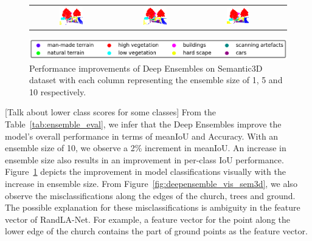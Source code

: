 \begin{figure}[h!]
\begin{tabular}{cccc}
            \includegraphics[width=0.30\textwidth, height=0.15\textheight]{images/seg_output/deep_ensembles/2_1.pdf} &
            \includegraphics[width=0.30\textwidth, height=0.15\textheight]{images/seg_output/deep_ensembles/2_5.pdf}& 
            \includegraphics[width=0.30\textwidth, height=0.15\textheight]{images/seg_output/deep_ensembles/2_10.pdf}\\
        \end{tabular}
        \includegraphics[scale=0.45]{images/legend.png}
        \caption{Performance improvements of Deep Ensembles on Semantic3D dataset with each column representing the ensemble size of 1, 5 and 10 respectively.}
        \label{fig:deepensemble_improv}
    \end{figure}

    [Talk about lower class scores for some classes]
    From the Table~\ref{tab:ensemble_eval}, we infer that the Deep Ensembles improve the model's overall performance in terms of meanIoU and Accuracy.
    With an ensemble size of 10, we observe a 2\% increment in meanIoU.
    An increase in ensemble size also results in an improvement in per-class IoU performance.
    Figure~\ref{fig:deepensemble_improv} depicts the improvement in model classifications visually with the increase in ensemble size.
    From Figure~\ref{fig:deepensemble_vis_sem3d}, we also observe the misclassifications along the edges of the church, trees and ground.
    The possible explanation for these misclassifications is ambiguity in the feature vector of RandLA-Net. For example, a feature vector for the point along the lower edge of the church contains the part of ground points as the feature vector.
